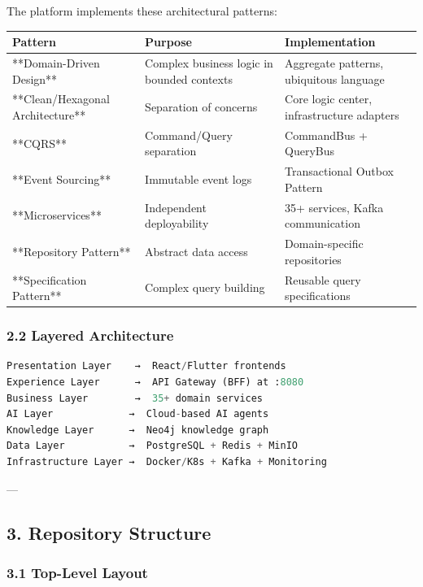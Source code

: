 \documentclass[11pt,a4paper]{article}
\begin{document}
The platform implements these architectural patterns:

\begin{table}[H]
\centering
\begin{tabular}{|l|l|l|}
\hline
Pattern & Purpose & Implementation \\
\hline
**Domain-Driven Design** & Complex business logic in bounded contexts & Aggregate patterns, ubiquitous language \\
\hline
**Clean/Hexagonal Architecture** & Separation of concerns & Core logic center, infrastructure adapters \\
\hline
**CQRS** & Command/Query separation & CommandBus + QueryBus \\
\hline
**Event Sourcing** & Immutable event logs & Transactional Outbox Pattern \\
\hline
**Microservices** & Independent deployability & 35+ services, Kafka communication \\
\hline
**Repository Pattern** & Abstract data access & Domain-specific repositories \\
\hline
**Specification Pattern** & Complex query building & Reusable query specifications \\
\hline
\end{tabular}
\end{table}

\subsubsection{2.2 Layered Architecture}

\begin{lstlisting}[language=Python, caption=text code]
Presentation Layer    →  React/Flutter frontends
Experience Layer      →  API Gateway (BFF) at :8080
Business Layer        →  35+ domain services
AI Layer             →  Cloud-based AI agents
Knowledge Layer      →  Neo4j knowledge graph
Data Layer           →  PostgreSQL + Redis + MinIO
Infrastructure Layer →  Docker/K8s + Kafka + Monitoring
\end{lstlisting}

---

\subsection{3. Repository Structure}

\subsubsection{3.1 Top-Level Layout}
\end{document}
